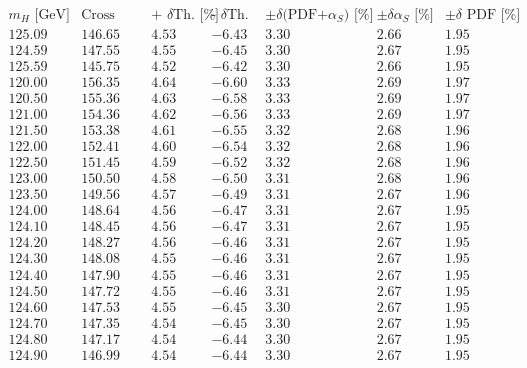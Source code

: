 \begin{table}[!h]
\begin{center}
\begin{equation}
\begin{array}{|c|c|c|c|c|c|c|}
 \hline
 m_H  \text{ [GeV]}&\text{Cross Section [pb]}&\text{+ $\delta$Th. [\%]}&\text{- $\delta$Th. [\%]}&\pm\delta\text{(PDF+$\alpha_S$) [\%]}& \pm\delta\text{$\alpha_S$ [\%]} & \pm\delta\text{ PDF [\%]}  \\
\hline 
125.09 & 146.65 & 4.53 & -6.43 & 3.30 & 2.66 & 1.95\\
\hline 
124.59 & 147.55 & 4.55 & -6.45 & 3.30 & 2.67 & 1.95\\
\hline 
125.59 & 145.75 & 4.52 & -6.42 & 3.30 & 2.66 & 1.95\\
\hline 
120.00 & 156.35 & 4.64 & -6.60 & 3.33 & 2.69 & 1.97\\
\hline 
120.50 & 155.36 & 4.63 & -6.58 & 3.33 & 2.69 & 1.97\\
\hline 
121.00 & 154.36 & 4.62 & -6.56 & 3.33 & 2.69 & 1.97\\
\hline 
121.50 & 153.38 & 4.61 & -6.55 & 3.32 & 2.68 & 1.96\\
\hline 
122.00 & 152.41 & 4.60 & -6.54 & 3.32 & 2.68 & 1.96\\
\hline 
122.50 & 151.45 & 4.59 & -6.52 & 3.32 & 2.68 & 1.96\\
\hline 
123.00 & 150.50 & 4.58 & -6.50 & 3.31 & 2.68 & 1.96\\
\hline 
123.50 & 149.56 & 4.57 & -6.49 & 3.31 & 2.67 & 1.96\\
\hline 
124.00 & 148.64 & 4.56 & -6.47 & 3.31 & 2.67 & 1.95\\
\hline 
124.10 & 148.45 & 4.56 & -6.47 & 3.31 & 2.67 & 1.95\\
\hline 
124.20 & 148.27 & 4.56 & -6.46 & 3.31 & 2.67 & 1.95\\
\hline 
124.30 & 148.08 & 4.55 & -6.46 & 3.31 & 2.67 & 1.95\\
\hline 
124.40 & 147.90 & 4.55 & -6.46 & 3.31 & 2.67 & 1.95\\
\hline 
124.50 & 147.72 & 4.55 & -6.46 & 3.31 & 2.67 & 1.95\\
\hline 
124.60 & 147.53 & 4.55 & -6.45 & 3.30 & 2.67 & 1.95\\
\hline 
124.70 & 147.35 & 4.54 & -6.45 & 3.30 & 2.67 & 1.95\\
\hline 
124.80 & 147.17 & 4.54 & -6.44 & 3.30 & 2.67 & 1.95\\
\hline 
124.90 & 146.99 & 4.54 & -6.44 & 3.30 & 2.67 & 1.95\\

\end{array}
\end{equation}
\end{center}
\end{table}
